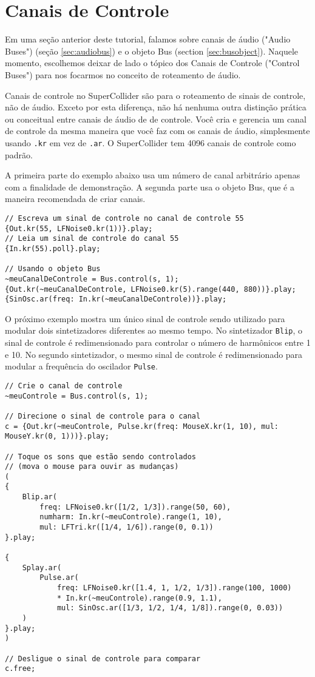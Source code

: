 \section{Canais de Controle}
\label{sec:control-buses}

Em uma seção anterior deste tutorial, falamos sobre canais de áudio ("Audio Buses") (seção \ref{sec:audiobus}) e o objeto Bus (section \ref{sec:busobject}). Naquele momento, escolhemos deixar de lado o tópico dos Canais de Controle ("Control Buses") para nos focarmos no conceito de roteamento de áudio.

Canais de controle no SuperCollider são para o roteamento de sinais de controle, não de áudio. Exceto por esta diferença, não há nenhuma outra distinção prática ou conceitual entre canais de áudio de de controle. Você cria e gerencia um canal de controle da mesma maneira que você faz com os canais de áudio, simplesmente usando \texttt{.kr} em vez de \texttt{.ar}. O SuperCollider tem  4096 canais de controle como padrão.

A primeira parte do exemplo abaixo usa um número de canal arbitrário apenas com a finalidade de demonstração. A segunda parte usa o objeto Bus, que é a maneira recomendada de criar canais.


\begin{lstlisting}[style=SuperCollider-IDE, basicstyle=\scttfamily\footnotesize]
// Escreva um sinal de controle no canal de controle 55
{Out.kr(55, LFNoise0.kr(1))}.play;
// Leia um sinal de controle do canal 55
{In.kr(55).poll}.play;

// Usando o objeto Bus
~meuCanalDeControle = Bus.control(s, 1);
{Out.kr(~meuCanalDeControle, LFNoise0.kr(5).range(440, 880))}.play;
{SinOsc.ar(freq: In.kr(~meuCanalDeControle))}.play;
\end{lstlisting}

O próximo exemplo mostra um único sinal de controle sendo utilizado para modular dois sintetizadores diferentes ao mesmo tempo. No sintetizador \texttt{Blip}, o sinal de controle é redimensionado para controlar o número de harmônicos entre 1 e 10. No segundo sintetizador, o mesmo sinal de controle é redimensionado para modular a frequência do oscilador \texttt{Pulse}.

\begin{lstlisting}[style=SuperCollider-IDE, basicstyle=\scttfamily\footnotesize]
// Crie o canal de controle
~meuControle = Bus.control(s, 1);

// Direcione o sinal de controle para o canal
c = {Out.kr(~meuControle, Pulse.kr(freq: MouseX.kr(1, 10), mul: MouseY.kr(0, 1)))}.play;

// Toque os sons que estão sendo controlados
// (mova o mouse para ouvir as mudanças)
(
{
	Blip.ar(
		freq: LFNoise0.kr([1/2, 1/3]).range(50, 60),
		numharm: In.kr(~meuControle).range(1, 10),
		mul: LFTri.kr([1/4, 1/6]).range(0, 0.1))
}.play;

{
	Splay.ar(
		Pulse.ar(
			freq: LFNoise0.kr([1.4, 1, 1/2, 1/3]).range(100, 1000)
			* In.kr(~meuControle).range(0.9, 1.1),
			mul: SinOsc.ar([1/3, 1/2, 1/4, 1/8]).range(0, 0.03))
	)
}.play;
)

// Desligue o sinal de controle para comparar
c.free;
\end{lstlisting}

